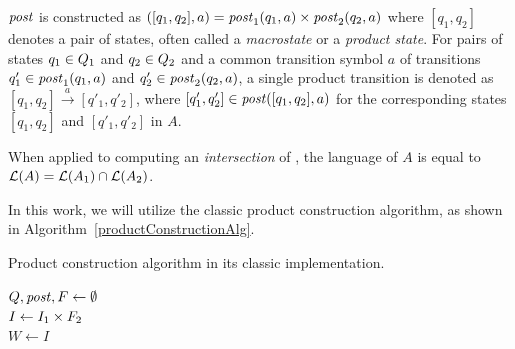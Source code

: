 $\mathit{post}$ is constructed as $([q_1, q_2], a) = \mathit{post}_1(q_1, a) \times \mathit{post}_2(q_2, a)$ where $[q_1, q_2]$ denotes a pair of states, often called a \emph{macrostate} or a \emph{product state}. For pairs of states $q_1 \in Q_1$ and $q_2 \in Q_2$ and a common transition symbol $a$ of transitions $q'_1 \in \mathit{post}_1(q_1, a)$ and $q'_2 \in \mathit{post}_2(q_2,a)$, a single product transition is denoted as $[q_1, q_2] \xrightarrow{a} [q'_1, q'_2]$, where $[q'_1, q'_2] \in \mathit{post}([q_1, q_2], a)$ for the corresponding states $[q_1, q_2]$ and $[q'_1, q'_2]$ in $A$.

When applied to computing an \emph{intersection} of \nfas, the language of $A$ is equal to $ \mathcal{L}(A) = \mathcal{L}(A_1) \cap \mathcal{L}(A_2) $.

In this work, we will utilize the classic product construction algorithm, as shown in Algorithm~\ref{productConstructionAlg}.

\begin{algorithm}[ht]
\caption{Product construction algorithm in its classic implementation.}\label{productConstructionAlg}
\DontPrintSemicolon
{}
\BlankLine
$Q, \mathit{post}, F \gets \emptyset$ \\
$I \gets I_1 \times F_2$ \\
$W \gets  I$

\end{algorithm}

